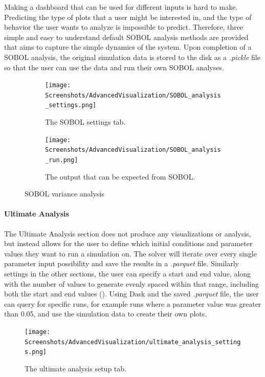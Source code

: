Making a dashboard that can be used for different inputs is hard to make. Predicting the type of plots that a user might be interested in, and the type of behavior the user wants to analyze is impossible to predict. 
Therefore, three simple and easy to understand default SOBOL analysis methods are provided that aims to capture the simple dynamics of the system. 
Upon completion of a SOBOL analysis, the original simulation data is stored to the disk as a \textit{.pickle} file so that the user can use the data and run their own SOBOL analyses. 

\begin{figure}[!ht]
    \centering
    \begin{subfigure}{0.49\linewidth}
        \centering
        \captionsetup{width=1\linewidth}
        \texttt{[image: Screenshots/AdvancedVisualization/SOBOL\_analysis\_settings.png]}
        \caption{
            The SOBOL settings tab. 
        }
        \label{fig:ss:av:SOBOL_analysis_settings}
    \end{subfigure}
    \hfill
    \begin{subfigure}{0.49\linewidth}
        \centering
        \captionsetup{width=1\linewidth}
        \texttt{[image: Screenshots/AdvancedVisualization/SOBOL\_analysis\_run.png]}
        \caption{
            The output that can be expected from SOBOL. 
        }
        \label{fig:ss:av:SOBOL_analysis_run}
    \end{subfigure}
    \caption{SOBOL variance analysis}
\end{figure}

\paragraph{Ultimate Analysis}
\label{sec:ultimate_analysis}
The Ultimate Analysis section does not produce any visualizations or analysis, but instead allows for the user to define which initial conditions and parameter values they want to run a simulation on.
The solver will iterate over every single parameter input possibility and save the results in a \textit{.parquet} file.
Similarly settings in the other sections, the user can specify a start and end value, along with the number of values to generate evenly spaced within that range, including both the start and end values ().
\newline
Using Dask and the saved \textit{.parquet} file, the user can query for specific runs, for example runs where a parameter value was greater than 0.05, and use the simulation data to create their own plots.
\begin{figure}
    \centering
    \texttt{[image: Screenshots/AdvancedVisualization/ultimate\_analysis\_settings.png]}
    \caption{
        The ultimate analysis setup tab. 
    }
    \label{fig:ss:av:ultimate_analysis_settings}
\end{figure}

